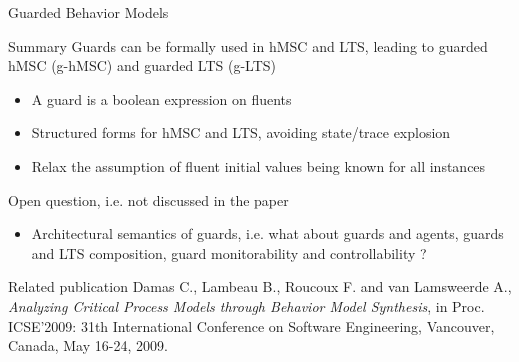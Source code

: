 \documentclass[11pt]{beamer}
\begin{document}
\begin{frame}{Guarded Behavior Models}
	\small
	\begin{block}{Summary}
		Guards can be formally used in hMSC and LTS, leading to guarded hMSC (g-hMSC) and guarded LTS (g-LTS)
		\begin{itemize}
		       \item A guard is a boolean expression on fluents
		       \item Structured forms for hMSC and LTS, avoiding state/trace explosion
		       \item Relax the assumption of fluent initial values being known for all instances
		\end{itemize}
	\end{block}
	\begin{block}{Open question, i.e. not discussed in the paper}
		\begin{itemize}
			\item Architectural semantics of guards, i.e. what about guards and agents, guards and LTS composition, guard monitorability
			          and controllability ? 
		\end{itemize}
	\end{block}
	\begin{block}{Related publication}
		\scriptsize
		Damas C., Lambeau B., Roucoux F. and van Lamsweerde A., \emph{Analyzing Critical Process Models through Behavior Model Synthesis},
		in Proc. ICSE'2009: 31th International Conference on Software Engineering, Vancouver, Canada, May 16-24, 2009. 
	\end{block}
\end{frame}
\end{document}
